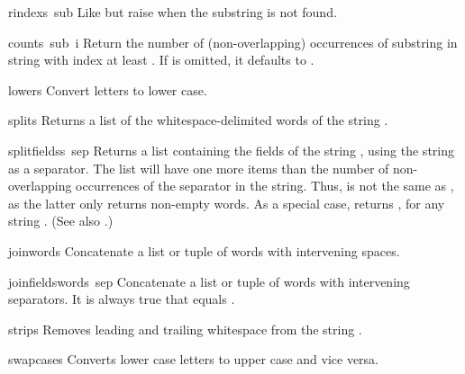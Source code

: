 \begin{funcdesc}{rindex}{s\, sub}
Like  but raise  when the substring is
not found.
\end{funcdesc}

\begin{funcdesc}{count}{s\, sub\, i}
Return the number of (non-overlapping) occurrences of substring
 in string  with index at least .
If  is omitted, it defaults to .
\end{funcdesc}

\begin{funcdesc}{lower}{s}
Convert letters to lower case.
\end{funcdesc}

\begin{funcdesc}{split}{s}
Returns a list of the whitespace-delimited words of the string
.
\end{funcdesc}

\begin{funcdesc}{splitfields}{s\, sep}
  Returns a list containing the fields of the string , using
  the string  as a separator.  The list will have one more
  items than the number of non-overlapping occurrences of the
  separator in the string.  Thus,  is not the same as , as the latter
  only returns non-empty words.  As a special case,
   returns \code{[\var{s}]}, for any string
  .  (See also .)
\end{funcdesc}

\begin{funcdesc}{join}{words}
Concatenate a list or tuple of words with intervening spaces.
\end{funcdesc}

\begin{funcdesc}{joinfields}{words\, sep}
Concatenate a list or tuple of words with intervening separators.
It is always true that
equals .
\end{funcdesc}

\begin{funcdesc}{strip}{s}
Removes leading and trailing whitespace from the string
.
\end{funcdesc}

\begin{funcdesc}{swapcase}{s}
Converts lower case letters to upper case and vice versa.
\end{funcdesc}

